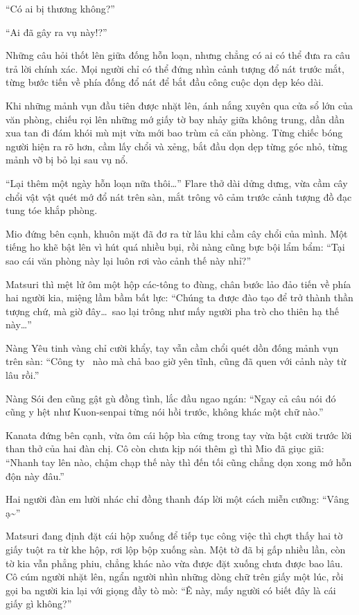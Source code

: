 \documentclass[../main.tex]{subfiles}
\begin{document}
``Có ai bị thương không?''

``Ai đã gây ra vụ này!?''

Những câu hỏi thốt lên giữa đống hỗn loạn, nhưng chẳng có ai có thể đưa ra câu trả lời chính xác. Mọi người chỉ có thể đứng nhìn cảnh tượng đổ nát trước mắt, từng bước tiến về phía đống đổ nát để bắt đầu công cuộc dọn dẹp kéo dài.

\ct

Khi những mảnh vụn đầu tiên được nhặt lên, ánh nắng xuyên qua cửa sổ lớn của văn phòng, chiếu rọi lên những mớ giấy tờ bay nhảy giữa không trung, dần dần xua tan đi đám khói mù mịt vừa mới bao trùm cả căn phòng. Từng chiếc bóng người hiện ra rõ hơn, cầm lấy chổi và xẻng, bắt đầu dọn dẹp từng góc nhỏ, từng mảnh vỡ bị bỏ lại sau vụ nổ.

``Lại thêm một ngày hỗn loạn nữa thôi\dots'' Flare thở dài dửng dưng, vừa cầm cây chổi vật vật quét mớ đổ nát trên sàn, mắt trông vô cảm trước cảnh tượng đồ đạc tung tóe khắp phòng.

Mio đứng bên cạnh, khuôn mặt đã đơ ra từ lâu khi cầm cây chổi của mình. Một tiếng ho khẽ bật lên vì hút quá nhiều bụi, rồi nàng cũng bực bội lẩm bẩm: ``Tại sao cái văn phòng này lại luôn rơi vào cảnh thế này nhỉ?''

Matsuri thì mệt lử ôm một hộp các-tông to đùng, chân bước lảo đảo tiến về phía hai người kia, miệng lầm bầm bất lực: ``Chúng ta được đào tạo để trở thành thần tượng chứ, mà giờ đây\dots\ sao lại trông như mấy người pha trò cho thiên hạ thế này\dots''


Nàng Yêu tinh vàng chỉ cười khẩy, tay vẫn cầm chổi quét dồn đống mảnh vụn trên sàn: ``Công ty \hll\ nào mà chả bao giờ yên tĩnh, cũng đã quen với cảnh này từ lâu rồi.''

Nàng Sói đen cũng gật gù đồng tình, lắc đầu ngao ngán: ``Ngay cả câu nói đó cũng y hệt như Kuon-senpai từng nói hồi trước, không khác một chữ nào.''

Kanata đứng bên cạnh, vừa ôm cái hộp bìa cứng trong tay vừa bật cười trước lời than thở của hai đàn chị. Cô còn chưa kịp nói thêm gì thì Mio đã giục giã: ``Nhanh tay lên nào, chậm chạp thế này thì đến tối cũng chẳng dọn xong mớ hỗn độn này đâu.''

Hai người đàn em lười nhác chỉ đồng thanh đáp lời một cách miễn cưỡng: ``Vâng ạ\~{}''

Matsuri đang định đặt cái hộp xuống để tiếp tục công việc thì chợt thấy hai tờ giấy tuột ra từ khe hộp, rơi lộp bộp xuống sàn. Một tờ đã bị gấp nhiều lần, còn tờ kia vẫn phẳng phiu, chẳng khác nào vừa được đặt xuống chưa được bao lâu. Cô cúm người nhặt lên, ngẩn người nhìn những dòng chữ trên giấy một lúc, rồi gọi ba người kia lại với giọng đầy tò mò: ``Ê này, mấy người có biết đây là cái giấy gì không?''
\end{document}
